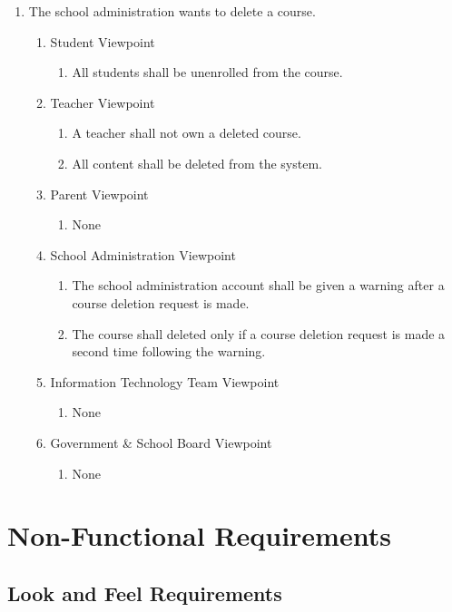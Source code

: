 \documentclass[]{article}
\begin{document}
\begin{enumerate}[{BE}1.]
	\item The school administration wants to delete a course.
	\begin{enumerate}[{VP1}.1]
		\item Student Viewpoint
			\begin{enumerate}
				\item All students shall be unenrolled from the course.
			\end{enumerate}
		\item Teacher Viewpoint
			\begin{enumerate}
				\item A teacher shall not own a deleted course.
				\item{All content shall be deleted from the system.}
			\end{enumerate}
		\item Parent Viewpoint
			\begin{enumerate}
				\item None
			\end{enumerate}
		\item School Administration Viewpoint
			\begin{enumerate}
				\item The school administration account shall be given a warning after a 
course
deletion request is made. 
\item The course shall deleted only if a course deletion
request is made a second time following the warning.
			\end{enumerate}
		\item Information Technology Team Viewpoint
			\begin{enumerate}
				\item None
			\end{enumerate}
		\item Government \& School Board Viewpoint
			\begin{enumerate}
				\item None
			\end{enumerate}
	\end{enumerate}

\end{enumerate}


\section{Non-Functional Requirements}
\label{sec:non-functional_requirements}
\subsection{Look and Feel Requirements}
\label{sub:look_and_feel_requirements}
\end{document}
